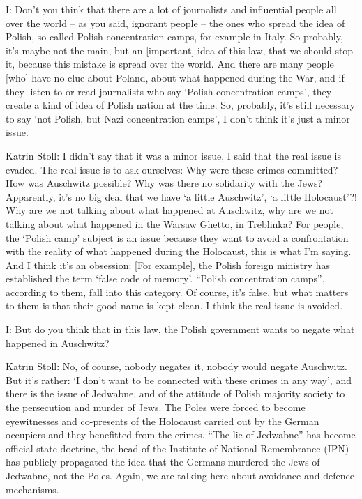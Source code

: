  

I: Don’t you think that there are a lot of journalists and influential people all over the world – as you said, ignorant people – the ones who spread the idea of Polish, so-called Polish concentration camps, for example in Italy. So probably, it’s maybe not the main, but an [important] idea of this law, that we should stop it, because this mistake is spread over the world. And there are many people [who] have no clue about Poland, about what happened during the War, and if they listen to or read journalists who say ‘Polish concentration camps’, they create a kind of idea of Polish nation at the time. So, probably, it’s still necessary to say ‘not Polish, but Nazi concentration camps’, I don’t think it’s just a minor issue. 

 

Katrin Stoll: I didn’t say that it was a minor issue, I said that the real issue is evaded. The real issue is to ask ourselves: Why were these crimes committed? How was Auschwitz possible? Why was there no solidarity with the Jews? Apparently, it’s no big deal that we have ‘a little Auschwitz’, ‘a little Holocaust’?! Why are we not talking about what happened at Auschwitz, why are we not talking about what happened in the Warsaw Ghetto, in Treblinka? For people, the ‘Polish camp’ subject is an issue because they want to avoid a confrontation with the reality of what happened during the Holocaust, this is what I’m saying. And I think it’s an obsession: [For example], the Polish foreign ministry has established the term ‘false code of memory’. “Polish concentration camps”, according to them, fall into this category. Of course, it’s false, but what matters to them is that their good name is kept clean. I think the real issue is avoided. 

 

I: But do you think that in this law, the Polish government wants to negate what happened in Auschwitz? 

 

Katrin Stoll: No, of course, nobody negates it, nobody would negate Auschwitz. But it’s rather: ‘I don’t want to be connected with these crimes in any way’, and there is the issue of Jedwabne, and of the attitude of Polish majority society to the persecution and murder of Jews. The Poles were forced to become eyewitnesses and co-presents of the Holocaust carried out by the German occupiers and they benefitted from the crimes.  “The lie of Jedwabne” has become official state doctrine, the head of the Institute of National Remembrance (IPN) has publicly propagated the idea that the Germans murdered the Jews of Jedwabne, not the Poles. Again, we are talking here about avoidance and defence mechanisms. 

